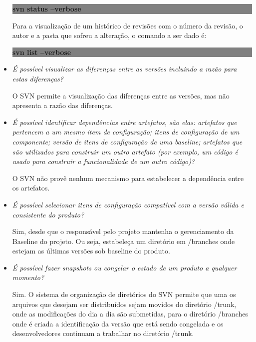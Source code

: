 \begin{itemize}
    \begin{centering}
    \colorbox{Gray}{
    \begin{minipage}{120px}
      \textbf{svn status --verbose}
    \end{minipage}
    }

    \end{centering}

    Para a visualização de um histórico de revisões com o número da revisão, o autor e a pasta que sofreu a alteração, o comando a ser dado é:

     \begin{centering}
    \colorbox{Gray}{
    \begin{minipage}{120px}
      \textbf{svn list --verbose}
    \end{minipage}
    }

    \end{centering}

  \item \textit{É possível visualizar as diferenças entre as versões incluindo a razão para estas
  diferenças?}

      O SVN permite a visualização das diferenças entre as versões, mas não apresenta a razão das diferenças.

  \item \textit{É possível identificar dependências entre artefatos, são elas: artefatos que pertencem a um mesmo item de configuração; itens de configuração de um componente; versão de itens de configuração de uma baseline; artefatos que são utilizados para construir um outro artefato  (por exemplo, um código é usado para construir a funcionalidade de um outro código)?}
      
      O SVN não provê nenhum mecanismo para estabelecer a dependência entre os artefatos.
      
  \item \textit{É possível selecionar itens de configuração compatível com a versão válida e consistente do
  produto?}

      Sim, desde que o responsável pelo projeto mantenha o gerenciamento da Baseline do projeto. Ou seja, estabeleça um diretório em /branches onde estejam as últimas versões sob baseline do produto.

  \item \textit{É possível fazer snapshots ou congelar o estado de um produto a qualquer momento?}

      Sim. O sistema de organização de diretórios do SVN permite que uma os arquivos que desejam ser distribuídos sejam movidos do diretório /trunk, onde as modificações do dia a dia são submetidas, para  o diretório /branches onde é criada a identificação da versão que está sendo congelada e os desenvolvedores continuam a trabalhar no diretório /trunk.


\end{itemize}
